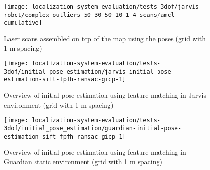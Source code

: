 \begin{figure}[H]
	\centering
	\texttt{[image: localization-system-evaluation/tests-3dof/jarvis-robot/complex-outliers-50-30-50-10-1-4-scans/amcl-cumulative]}
	\caption{Laser scans assembled on top of the map using the  poses (grid with 1 m spacing)}
	\label{fig:localization-system-evaluation_complex-path-with-outliers-50-30-50-10cm-per-sec-velocity-1-4-scans-amcl-cumulative}
\end{figure}


\begin{figure}[H]
	\centering
	\texttt{[image: localization-system-evaluation/tests-3dof/initial\_pose\_estimation/jarvis-initial-pose-estimation-sift-fpfh-ransac-gicp-1]}
	\caption{Overview of initial pose estimation using feature matching in Jarvis environment (grid with 1 m spacing)}
	\label{fig:localization-system-evaluation_jarvis-initial-pose-estimation-sift-fpfh-ransac-gicp-1}
\end{figure}


\begin{figure}[H]
	\centering
	\texttt{[image: localization-system-evaluation/tests-3dof/initial\_pose\_estimation/guardian-initial-pose-estimation-sift-fpfh-ransac-gicp-1]}
	\caption{Overview of initial pose estimation using feature matching in Guardian static environment (grid with 1 m spacing)}
	\label{fig:localization-system-evaluation_ship-interior-initial-pose-estimation-sift-fpfh-ransac-gicp-1}
\end{figure}





